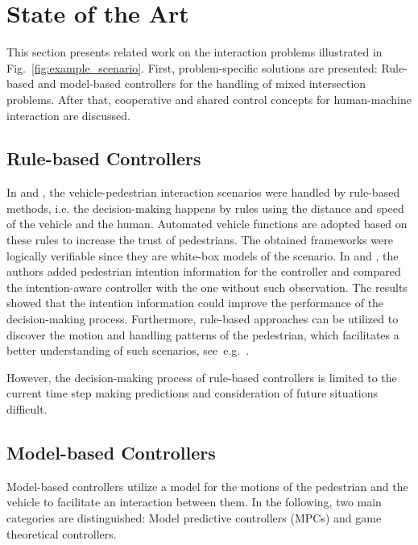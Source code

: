 \documentclass[conference]{IEEEtran}
\begin{document}
	
	\section{State of the Art} \label{sec:SOA}
	This section presents related work on the interaction problems illustrated in Fig.~\ref{fig:example_scenario}. First, problem-specific solutions are presented: Rule-based and model-based controllers for the handling of mixed intersection problems. After that, cooperative and shared control concepts for human-machine interaction are discussed.
	
	\subsection{Rule-based Controllers}
	In \cite{2015_VehiclepedestrianInteractionMixed_chao} and \cite{2019_HybridControlDesign_kapaniaa}, the vehicle-pedestrian interaction scenarios were handled by rule-based methods, 
	i.e. the decision-making happens by rules using the distance and speed of the vehicle and the human. Automated vehicle functions are adopted based on these rules to increase the trust of pedestrians. The obtained frameworks were logically verifiable since they are white-box models of the scenario. In \cite{2020_DecisionMakingProcess_hsu} and \cite{2023_IntentionAwareDecisionMakingMixed_varga}, the authors added pedestrian intention information for the controller and compared the intention-aware controller with the one without such observation. The results showed that the intention information could improve the performance of the decision-making process. Furthermore, rule-based approaches can be utilized to discover the motion and handling patterns of the pedestrian, which facilitates a better understanding of such scenarios, see~e.g.~\cite{2022_HumanMachinePatternsSystem_flemisch}. 
	
	However, the decision-making process of rule-based controllers is limited to the current time step making predictions and consideration of future situations difficult.
	
	
	\subsection{Model-based Controllers}
	Model-based controllers utilize a model for the motions of the pedestrian and the vehicle to facilitate an interaction between them. In the following, two main categories are distinguished: Model predictive controllers (MPCs) and game theoretical controllers.
	
\end{document}
